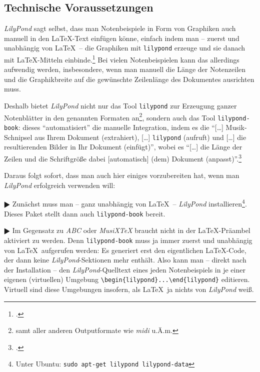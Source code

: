 \subsection{Technische Voraussetzungen}

\textit{LilyPond} sagt selbst, dass man Notenbeispiele in Form von Graphiken auch
manuell in den \LaTeX-Text einfügen könne, einfach indem man -- zuerst und
unabhängig von \LaTeX\ -- die Graphiken mit \texttt{lilypond} erzeuge und sie
danach mit \LaTeX-Mitteln einbinde.\footcite[vgl.][20]{LilyPond2018e} Bei vielen
Notenbeispielen kann das allerdings aufwendig werden, insbesondere, wenn man
manuell die Länge der Notenzeilen und die Graphikbreite auf die gewünschte
Zeilenlänge des Dokumentes ausrichten muss.

Deshalb bietet \textit{LilyPond} nicht nur das Tool \texttt{lilypond} zur
Erzeugung ganzer Notenblätter in den genannten Formaten an\footnote{samt aller
anderen Outputformate wie \textit{midi} u.Ä.m.}, sondern auch das Tool
\texttt{lilypond-book}: dieses \enquote{automatisiert} die manuelle Integration,
indem es die \enquote{[\ldots] Musik-Schnipsel aus Ihrem Dokument (extrahiert),
[\ldots] \texttt{lilypond} (aufruft) und [\ldots] die resultierenden Bilder in
Ihr Dokument (einfügt)}, wobei es \enquote{[\ldots] die Länge der Zeilen und die
Schriftgröße dabei [automatisch] (dem) Dokument
(anpasst)}.\footcite[vgl.][20]{LilyPond2018e}

Daraus folgt sofort, dass man auch hier einiges vorzubereiten hat, wenn man
\textit{LilyPond} erfolgreich verwenden will:

$\RHD$ Zunächst muss man -- ganz unabhängig von \LaTeX\ -- \textit{LilyPond}
installieren\footnote{Unter Ubuntu: \texttt{sudo apt-get lilypond
lilypond-data}}. Dieses Paket stellt dann auch \texttt{lilypond-book} bereit.
  
$\RHD$ Im Gegensatz zu \textit{ABC} oder \textit{MusiX\TeX} braucht 
nicht in der \LaTeX-Präambel aktiviert zu werden. Denn \texttt{lilypond-book} muss
ja immer zuerst und unabhängig von \LaTeX\ aufgerufen werden: Es generiert erst den
eigentlichen \LaTeX-Code, der dann keine \textit{LilyPond}-Sektionen mehr
enthält. Also kann man -- direkt nach der Installation -- den
\textit{LilyPond}-Quelltext eines jeden Notenbeispiels in je einer eigenen
(virtuellen) Umgebung \verb|\begin{lilypond}...\end{lilypond}| editieren.
Virtuell sind diese Umgebungen insofern, als \LaTeX\ ja nichts von
\textit{LilyPond} weiß.

